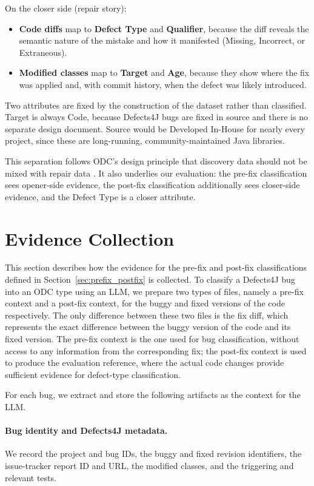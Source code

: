 \documentclass{iutbscthesis}
\begin{document}
On the closer side (repair story):
\begin{itemize}
    \item \textbf{Code diffs} map to \textbf{Defect Type} and \textbf{Qualifier}, because the diff reveals the semantic nature of the mistake and how it manifested (Missing, Incorrect, or Extraneous).
    \item \textbf{Modified classes} map to \textbf{Target} and \textbf{Age}, because they show where the fix was applied and, with commit history, when the defect was likely introduced.
\end{itemize}

Two attributes are fixed by the construction of the dataset rather than classified. Target is always Code, because Defects4J bugs are fixed in source and there is no separate design document. Source would be Developed In-House for nearly every project, since these are long-running, community-maintained Java libraries.

This separation follows ODC's design principle that discovery data should not be mixed with repair data \cite{chillarege1992odc}. It also underlies our evaluation: the pre-fix classification sees opener-side evidence, the post-fix classification additionally sees closer-side evidence, and the Defect Type is a closer attribute.

\section{Evidence Collection}
\label{sec:collection}

This section describes how the evidence for the pre-fix and post-fix classifications defined in Section~\ref{sec:prefix_postfix} is collected. To classify a Defects4J bug into an ODC type using an LLM, we prepare two types of files, namely a pre-fix context and a post-fix context, for the buggy and fixed versions of the code respectively. The only difference between these two files is the fix diff, which represents the exact difference between the buggy version of the code and its fixed version. The pre-fix context is the one used for bug classification, without access to any information from the corresponding fix; the post-fix context is used to produce the evaluation reference, where the actual code changes provide sufficient evidence for defect-type classification.

For each bug, we extract and store the following artifacts as the context for the LLM.

\paragraph{Bug identity and Defects4J metadata.} We record the project and bug IDs, the buggy and fixed revision identifiers, the issue-tracker report ID and URL, the modified classes, and the triggering and relevant tests.
\end{document}
